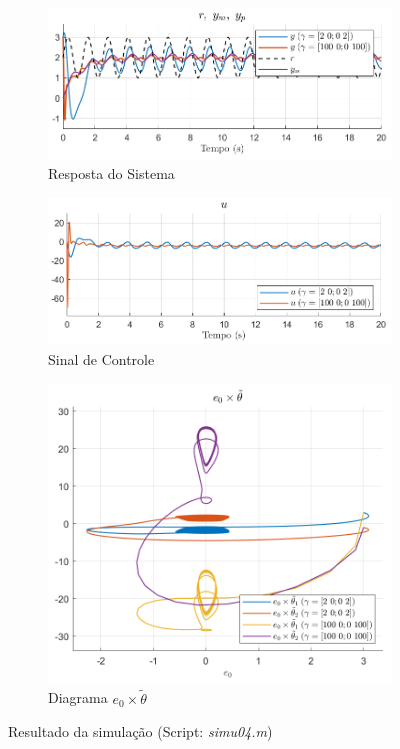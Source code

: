 \documentclass[10pt]{article}
\begin{document}
\begin{figure}[h!]
    \begin{subfigure}[b]{0.3\textwidth}
        \centering
        \includegraphics[width=\textwidth]{img/fig04c.png}
        \caption{Resposta do Sistema}
    \end{subfigure}
    \begin{subfigure}[b]{0.3\textwidth}
        \centering
        \includegraphics[width=\textwidth]{img/fig04e.png}
        \caption{Sinal de Controle}
    \end{subfigure}

    \begin{subfigure}[b]{0.3\textwidth}
        \centering
        \includegraphics[width=\textwidth]{img/fig04d.png}
        \caption{Diagrama $e_0 \times \tilde{\theta}$}
    \end{subfigure}

    \caption{Resultado da simulação (Script: \textit{simu04.m})}
    \label{fig:sim4}
\end{figure}
\end{document}
